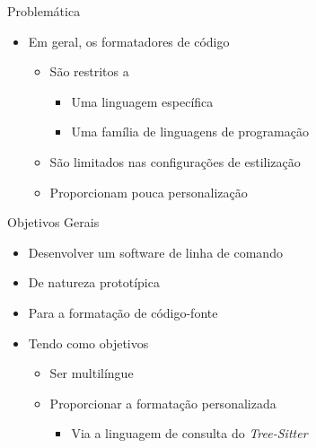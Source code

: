 \documentclass
  [ aspectratio=169,
    english,
    hyperref={citecolor=blue,colorlinks=true,linkcolor=blue,urlcolor=blue},
    brazil]
  {beamer}
\newcommand{\treesitter}{\textit{Tree-Sitter}\xspace}
\begin{document}

  \begin{frame}{Problemática}
    \begin{itemize}
      \item Em geral, os formatadores de código
            \begin{itemize}
              \item São restritos a
                    \begin{itemize}
                      \item Uma linguagem específica
                      \item Uma família de linguagens de programação
                    \end{itemize}
              \item São limitados nas configurações de estilização
              \item Proporcionam pouca personalização
            \end{itemize}
    \end{itemize}
  \end{frame}


  \begin{frame}{Objetivos Gerais}
    \begin{itemize}
      \item Desenvolver um software de linha de comando
      \item De natureza prototípica
      \item Para a formatação de código-fonte
      \item Tendo como objetivos
            \begin{itemize}
              \item Ser multilíngue
              \item Proporcionar a formatação personalizada
                    \begin{itemize}
                      \item Via a linguagem de consulta do \treesitter
                    \end{itemize}
            \end{itemize}
    \end{itemize}
  \end{frame}

\end{document}
